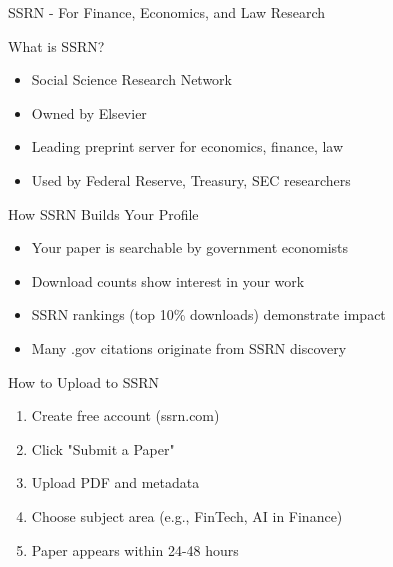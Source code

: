 \documentclass[11pt]{beamer}
\begin{document}
				\begin{frame}{SSRN - For Finance, Economics, and Law Research}
					\scriptsize
					\begin{block}{What is SSRN?}
						\begin{itemize}
							\item Social Science Research Network
							\item Owned by Elsevier
							\item Leading preprint server for economics, finance, law
							\item Used by Federal Reserve, Treasury, SEC researchers
						\end{itemize}
					\end{block}
					\begin{block}{How SSRN Builds Your Profile}
						\begin{itemize}
							\item Your paper is searchable by government economists
							\item Download counts show interest in your work
							\item SSRN rankings (top 10\% downloads) demonstrate impact
							\item Many .gov citations originate from SSRN discovery
						\end{itemize}
					\end{block}
					\begin{block}{How to Upload to SSRN}
						\begin{enumerate}
							\item Create free account (ssrn.com)
							\item Click "Submit a Paper"
							\item Upload PDF and metadata
							\item Choose subject area (e.g., FinTech, AI in Finance)
							\item Paper appears within 24-48 hours
						\end{enumerate}
					\end{block}
				\end{frame}
				
\end{document}
